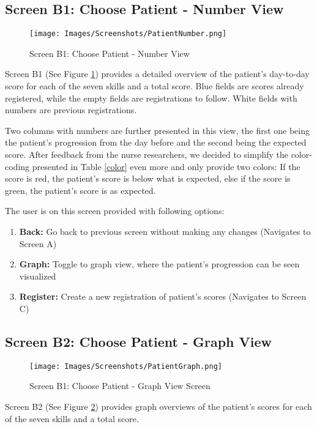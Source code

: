 \subsection*{Screen B1: Choose Patient - Number View}

\begin{figure}[H] \centering
			\texttt{[image: Images/Screenshots/PatientNumber.png]}
		\caption{Screen B1: Choose Patient - Number View} \label{fig:screenB1}
\end{figure}

Screen B1 (See Figure \ref{fig:screenB1}) provides a detailed overview of the patient's day-to-day score for each of the seven skills and a total score. 
Blue fields are scores already registered, while the empty fields are registrations to follow. White fields with numbers are previous registrations. 

Two columns with numbers are further presented in this view, the first one being the patient's progression from the day before and the second being the expected score. After feedback from the nurse researchers, we decided to simplify the color-coding presented in Table \ref{color} even more and only provide two colors: If the score is red, the patient's score is below what is expected, else if the score is green, the patient's score is as expected. 


The user is on this screen provided with following options: 
\begin{enumerate}
\item \textbf{Back:} Go back to previous screen without making any changes (Navigates to Screen A)
\item \textbf{Graph:} Toggle to graph view, where the patient's progression can be seen visualized
\item \textbf{Register:} Create a new registration of patient's scores (Navigates to Screen C)
\end{enumerate}\newpage


\subsection*{Screen B2: Choose Patient - Graph View}
\begin{figure}[H] \centering
			\texttt{[image: Images/Screenshots/PatientGraph.png]}
		\caption{Screen B1: Choose Patient - Graph View Screen} \label{fig:screenB2}
\end{figure}

Screen B2  (See Figure \ref{fig:screenB2}) provides graph overviews of the patient's scores for each of the seven skills and a total score. 

